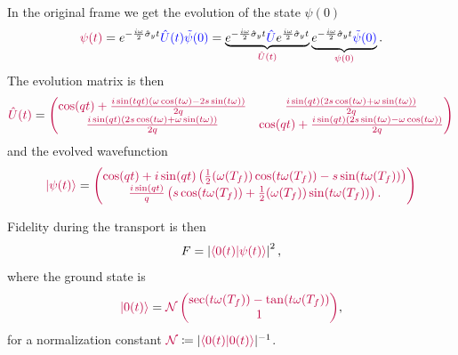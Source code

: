 In the original frame we get the evolution of the state $\psi(0)$
\begin{equation}
    \textcolor{purple}{\psi(t)}=e^{-\frac{i \omega}{2}\hat\sigma_y t} \textcolor{blue}{\hat U(t) \tilde\psi(0)} = \underbrace{e^{-\frac{i \omega}{2}\hat\sigma_y t} \textcolor{blue}{\hat U}e^{\frac{i \omega}{2}\hat\sigma_y t}}_{\textcolor{purple}{\hat U(t)}} \underbrace{e^{-\frac{i \omega}{2}\hat\sigma_y t} \textcolor{blue}{\tilde\psi(0)}}_{\textcolor{purple}{\psi(0)}}.
\end{equation}
The evolution matrix is then
\begin{equation}
    \textcolor{purple}{\hat U(t)}=\textcolor{purple}{\begin{pmatrix}
         \cos (q t)+\frac{i \sin (tqt) (\omega  \cos (t \omega )-2 s \sin (t \omega ))}{2 q} & \frac{i \sin (qt) (2 s \cos (t \omega )+\omega  \sin (t \omega ))}{2 q} \\
         \frac{i \sin (qt) (2 s \cos (t \omega )+\omega  \sin (t \omega ))}{2 q} & \cos (qt)+\frac{i \sin (qt) (2 s \sin (t \omega )-\omega  \cos (t \omega ))}{2 q} \\
        \end{pmatrix}}
\end{equation}
and the evolved wavefunction
\begin{equation}
    \textcolor{purple}{\ket{\psi(t)}}=\textcolor{purple}{\begin{pmatrix}
        \cos (qt)+i \sin (qt) \left(\frac{1}{2} (\omega(T_f) ) \cos (t \omega(T_f) )-s \sin (t \omega(T_f) )\right)\\
        \frac{i \sin (qt)}{q} \left(s \cos (t \omega(T_f) )+\frac{1}{2} (\omega(T_f) ) \sin (t \omega(T_f) )\right).
    \end{pmatrix}}
\end{equation}

Fidelity during the transport is then
\begin{equation}
    F=\left|\textcolor{purple}{\braket{0(t)|\psi(t)}}\right|^2,
\end{equation}
where the ground state is
\begin{equation}
    \textcolor{purple}{\ket{0(t)}}=\textcolor{purple}{\mathcal{N}\begin{pmatrix}
        \sec (t \omega (T_f))-\tan (t \omega (T_f))\\
        1
    \end{pmatrix}},
\end{equation}
for a normalization constant $\textcolor{purple}{\mathcal{N}}\coloneqq |\textcolor{purple}{\braket{0(t)|0(t)}}|^{-1}$.